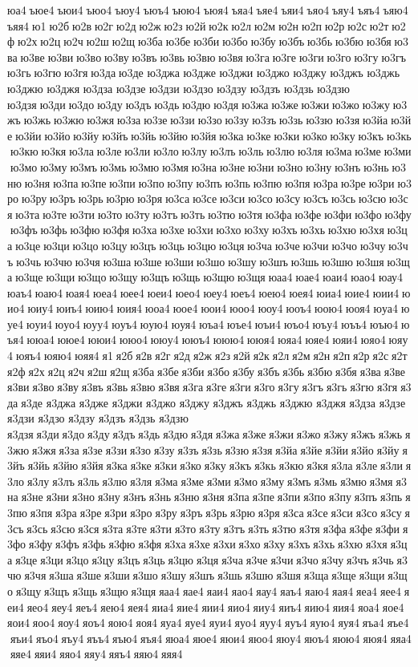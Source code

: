 юа4 ъюе4 ъюи4 ъюо4 ъюу4 ъюъ4 ъюю4 ъюя4 ъяа4 ъяе4 ъяи4 ъяо4 ъяу4 ъяъ4 ъяю4 ъяя4 ю1 ю2б ю2в ю2г ю2д ю2ж ю2з ю2й ю2к ю2л ю2м ю2н ю2п ю2р ю2с ю2т ю2ф ю2х ю2ц ю2ч ю2ш ю2щ ю3ба ю3бе ю3би ю3бо ю3бу ю3бъ ю3бь ю3бю ю3бя ю3ва ю3ве ю3ви ю3во ю3ву ю3въ ю3вь ю3вю ю3вя ю3га ю3ге ю3ги ю3го ю3гу ю3гъ ю3гь ю3гю ю3гя ю3да ю3де 	ю3джа 	ю3дже 	ю3джи 	ю3джо 	ю3джу 	ю3джъ 	ю3джь 	ю3джю 	ю3джя 	ю3дза 	ю3дзе 	ю3дзи 	ю3дзо 	ю3дзу 	ю3дзъ 	ю3дзь 	ю3дзю 	ю3дзя ю3ди ю3до ю3ду ю3дъ ю3дь ю3дю ю3дя ю3жа ю3же ю3жи ю3жо ю3жу ю3жъ ю3жь ю3жю ю3жя ю3за ю3зе ю3зи ю3зо ю3зу ю3зъ ю3зь ю3зю ю3зя ю3йа ю3йе ю3йи ю3йо ю3йу ю3йъ ю3йь ю3йю ю3йя ю3ка ю3ке ю3ки ю3ко ю3ку ю3къ ю3кь ю3кю ю3кя ю3ла ю3ле ю3ли ю3ло ю3лу ю3лъ ю3ль ю3лю ю3ля ю3ма ю3ме ю3ми ю3мо ю3му ю3мъ ю3мь ю3мю ю3мя ю3на ю3не ю3ни ю3но ю3ну ю3нъ ю3нь ю3ню ю3ня ю3па ю3пе ю3пи ю3по ю3пу ю3пъ ю3пь ю3пю ю3пя ю3ра ю3ре ю3ри ю3ро ю3ру ю3ръ ю3рь ю3рю ю3ря ю3са ю3се ю3си ю3со ю3су ю3съ ю3сь ю3сю ю3ся ю3та ю3те ю3ти ю3то ю3ту ю3тъ ю3ть ю3тю ю3тя ю3фа ю3фе ю3фи ю3фо ю3фу ю3фъ ю3фь ю3фю ю3фя ю3ха ю3хе ю3хи ю3хо ю3ху ю3хъ ю3хь ю3хю ю3хя ю3ца ю3це ю3ци ю3цо ю3цу ю3цъ ю3ць ю3цю ю3ця ю3ча ю3че ю3чи ю3чо ю3чу ю3чъ ю3чь ю3чю ю3чя ю3ша ю3ше ю3ши ю3шо ю3шу ю3шъ ю3шь ю3шю ю3шя ю3ща ю3ще ю3щи ю3що ю3щу ю3щъ ю3щь ю3щю ю3щя юаа4 юае4 юаи4 юао4 юау4 юаъ4 юаю4 юая4 юеа4 юее4 юеи4 юео4 юеу4 юеъ4 юею4 юея4 юиа4 юие4 юии4 юио4 юиу4 юиъ4 юию4 юия4 юоа4 юое4 юои4 юоо4 юоу4 юоъ4 юою4 юоя4 юуа4 юуе4 юуи4 юуо4 юуу4 юуъ4 юую4 юуя4 юъа4 юъе4 юъи4 юъо4 юъу4 юъъ4 юъю4 юъя4 ююа4 ююе4 ююи4 ююо4 ююу4 ююъ4 ююю4 ююя4 юяа4 юяе4 юяи4 юяо4 юяу4 юяъ4 юяю4 юяя4 я1 я2б я2в я2г я2д я2ж я2з я2й я2к я2л я2м я2н я2п я2р я2с я2т я2ф я2х я2ц я2ч я2ш я2щ я3ба я3бе я3би я3бо я3бу я3бъ я3бь я3бю я3бя я3ва я3ве я3ви я3во я3ву я3въ я3вь я3вю я3вя я3га я3ге я3ги я3го я3гу я3гъ я3гь я3гю я3гя я3да я3де 	я3джа 	я3дже 	я3джи 	я3джо 	я3джу 	я3джъ 	я3джь 	я3джю 	я3джя 	я3дза 	я3дзе 	я3дзи 	я3дзо 	я3дзу 	я3дзъ 	я3дзь 	я3дзю 	я3дзя я3ди я3до я3ду я3дъ я3дь я3дю я3дя я3жа я3же я3жи я3жо я3жу я3жъ я3жь я3жю я3жя я3за я3зе я3зи я3зо я3зу я3зъ я3зь я3зю я3зя я3йа я3йе я3йи я3йо я3йу я3йъ я3йь я3йю я3йя я3ка я3ке я3ки я3ко я3ку я3къ я3кь я3кю я3кя я3ла я3ле я3ли я3ло я3лу я3лъ я3ль я3лю я3ля я3ма я3ме я3ми я3мо я3му я3мъ я3мь я3мю я3мя я3на я3не я3ни я3но я3ну я3нъ я3нь я3ню я3ня я3па я3пе я3пи я3по я3пу я3пъ я3пь я3пю я3пя я3ра я3ре я3ри я3ро я3ру я3ръ я3рь я3рю я3ря я3са я3се я3си я3со я3су я3съ я3сь я3сю я3ся я3та я3те я3ти я3то я3ту я3тъ я3ть я3тю я3тя я3фа я3фе я3фи я3фо я3фу я3фъ я3фь я3фю я3фя я3ха я3хе я3хи я3хо я3ху я3хъ я3хь я3хю я3хя я3ца я3це я3ци я3цо я3цу я3цъ я3ць я3цю я3ця я3ча я3че я3чи я3чо я3чу я3чъ я3чь я3чю я3чя я3ша я3ше я3ши я3шо я3шу я3шъ я3шь я3шю я3шя я3ща я3ще я3щи я3що я3щу я3щъ я3щь я3щю я3щя яаа4 яае4 яаи4 яао4 яау4 яаъ4 яаю4 яая4 яеа4 яее4 яеи4 яео4 яеу4 яеъ4 яею4 яея4 яиа4 яие4 яии4 яио4 яиу4 яиъ4 яию4 яия4 яоа4 яое4 яои4 яоо4 яоу4 яоъ4 яою4 яоя4 яуа4 яуе4 яуи4 яуо4 яуу4 яуъ4 яую4 яуя4 яъа4 яъе4 яъи4 яъо4 яъу4 яъъ4 яъю4 яъя4 яюа4 яюе4 яюи4 яюо4 яюу4 яюъ4 яюю4 яюя4 яяа4 яяе4 яяи4 яяо4 яяу4 яяъ4 яяю4 яяя4